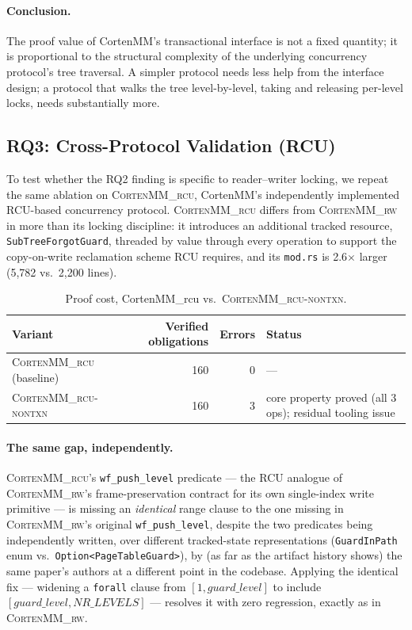 \documentclass[10pt]{article}
\newcommand{\corten}[1]{\textsc{CortenMM\_#1}}
\begin{document}
\paragraph{Conclusion.} The proof value of CortenMM's transactional
interface is not a fixed quantity; it is proportional to the structural
complexity of the underlying concurrency protocol's tree traversal. A
simpler protocol needs less help from the interface design; a protocol
that walks the tree level-by-level, taking and releasing per-level locks,
needs substantially more.

\subsection{RQ3: Cross-Protocol Validation (RCU)}
\label{sec:eval:rcu}

To test whether the RQ2 finding is specific to reader--writer locking,
we repeat the same ablation on \corten{rcu}, CortenMM's independently
implemented RCU-based concurrency protocol. \corten{rcu} differs from
\corten{rw} in more than its locking discipline: it introduces an
additional tracked resource, \texttt{SubTreeForgotGuard}, threaded by
value through every operation to support the copy-on-write reclamation
scheme RCU requires, and its \texttt{mod.rs} is 2.6$\times$ larger
(5{,}782 vs.\ 2{,}200 lines).

\begin{table}[h]
\centering
\caption{Proof cost, CortenMM\_rcu vs.\ \corten{rcu-nontxn}.}
\label{tab:rcu-proof}
\begin{tabularx}{\textwidth}{@{}l r r >{\raggedright\arraybackslash}X@{}}
\toprule
Variant & Verified obligations & Errors & Status \\
\midrule
\corten{rcu} (baseline) & 160 & 0 & --- \\
\corten{rcu-nontxn}     & 160 & 3 & core property proved (all 3 ops); residual tooling issue \\
\bottomrule
\end{tabularx}
\end{table}

\paragraph{The same gap, independently.} \corten{rcu}'s
\texttt{wf\_push\_level} predicate --- the RCU analogue of \corten{rw}'s
frame-preservation contract for its own single-index write primitive ---
is missing an \emph{identical} range clause to the one missing in
\corten{rw}'s original \texttt{wf\_push\_level}, despite the two
predicates being independently written, over different tracked-state
representations (\texttt{GuardInPath} enum vs.\ \texttt{Option<PageTableGuard>}),
by (as far as the artifact history shows) the same paper's authors at a
different point in the codebase. Applying the identical fix --- widening
a \texttt{forall} clause from
$[1,\mathit{guard\_level}]$ to include $[\mathit{guard\_level},
\mathit{NR\_LEVELS}]$ --- resolves it with zero regression, exactly as
in \corten{rw}.
\end{document}
